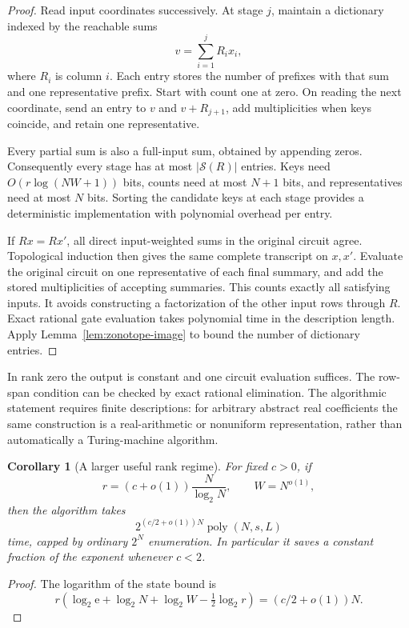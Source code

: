 \documentclass[11pt]{article}
\newtheorem{corollary}[theorem]{Corollary}
\theoremstyle{definition}
\newcommand{\poly}{\operatorname{poly}}
\newcommand{\Eul}{\mathrm e}
\begin{document}
\begin{proof}
Read input coordinates successively. At stage \(j\), maintain a dictionary
indexed by the reachable sums
\[
 v=\sum_{i=1}^j R_i x_i,
\]
where \(R_i\) is column \(i\). Each entry stores the number of prefixes
with that sum and one representative prefix. Start with count one at zero.
On reading the next coordinate, send an entry to \(v\) and \(v+R_{j+1}\),
add multiplicities when keys coincide, and retain one representative.

Every partial sum is also a full-input sum, obtained by appending zeros.
Consequently every stage has at most \(|\mathcal S(R)|\) entries. Keys need
\(O(r\log(NW+1))\) bits, counts need at most \(N+1\) bits, and representatives
need at most \(N\) bits. Sorting the candidate keys at each stage provides a
deterministic implementation with polynomial overhead per entry.

If \(Rx=Rx'\), all direct input-weighted sums in the original circuit agree.
Topological induction then gives the same complete transcript on \(x,x'\).
Evaluate the original circuit on one representative of each final summary,
and add the stored multiplicities of accepting summaries. This counts
exactly all satisfying inputs. It avoids constructing a factorization of
the other input rows through \(R\). Exact rational gate evaluation takes
polynomial time in the description length. Apply
Lemma~\ref{lem:zonotope-image} to bound the number of dictionary entries.
\end{proof}

In rank zero the output is constant and one circuit evaluation suffices.
The row-span condition can be checked by exact rational elimination. The
algorithmic statement requires finite descriptions: for arbitrary abstract
real coefficients the same construction is a real-arithmetic or nonuniform
representation, rather than automatically a Turing-machine algorithm.

\begin{corollary}[A larger useful rank regime]\label{cor:zonotope-regime}
For fixed \(c>0\), if
\[
 r=(c+o(1))\frac{N}{\log_2N},\qquad W=N^{o(1)},
\]
then the algorithm takes
\[
 2^{(c/2+o(1))N}\poly(N,s,L)
\]
time, capped by ordinary \(2^N\) enumeration. In particular it saves a
constant fraction of the exponent whenever \(c<2\).
\end{corollary}

\begin{proof}
The logarithm of the state bound is
\[
 r\left(\log_2\Eul+\log_2N+\log_2W-\tfrac12\log_2r\right)
 = (c/2+o(1))N.
\]
\end{proof}
\end{document}
